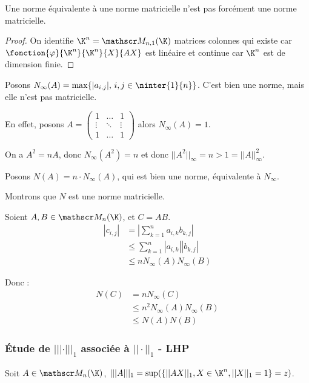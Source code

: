 \begin{remarque}
    Une norme équivalente à une norme matricielle n'est pas forcément une norme matricielle.
\end{remarque}

\begin{proof}
    On identifie $\K^n = \mathscr M_{n, 1}(\K)$ matrices colonnes qui existe 
    car $\fonction{\varphi}{\K^n}{\K^n}{X}{AX}$ est linéaire et continue car $\K^n$ est de dimension finie. 
\end{proof}

\begin{exemple}
    Posons $N_\infty(A) = \max\{ |a_{i, j}|, \, i, j \in \ninter{1}{n}\}$. 
    C'est bien une norme, mais elle n'est pas matricielle. 

    En effet, posons 
    $A = \begin{pmatrix}
        1 & \dots & 1 \\
        \vdots & \ddots & \vdots \\
        1 & \dots & 1
    \end{pmatrix}$ alors $N_\infty(A) = 1$.

    On a $A^2 = nA$, donc $N_\infty(A^2) = n$ et donc $||A^2||_\infty = n > 1 = ||A||_\infty^2$. 

    \lvspace Posons $N(A) = n \cdot N_\infty(A)$, qui est bien une norme, équivalente à $N_\infty$.

    Montrons que $N$ est une norme matricielle.

    Soient $A, B \in \mathscr M_n(\K)$, et $C = AB$. 
    \begin{align*}
        |c_{i, j}| & = \left| \sum_{k=1}^n a_{i, k} b_{k, j} \right| \\
        & \leqslant \sum_{k=1}^n |a_{i, k}| |b_{k, j}| \\
        & \leqslant n N_\infty(A) N_\infty(B)
    \end{align*}

    Donc :
    \begin{align*}
        N(C) & = n N_\infty(C) \\
        & \leqslant n^2 N_\infty(A) N_\infty(B) \\
        &  \leqslant N(A) N(B)
    \end{align*}
\end{exemple}

\subsubsection{Étude de $||| \cdot |||_1$ associée à $|| \cdot ||_1$ - LHP}
Soit $A \in \mathscr M_n(\K)$, $|||A|||_1 = \sup (\{ ||AX||_1, X \in \K^n, ||X||_1 = 1 \} = z) $.

